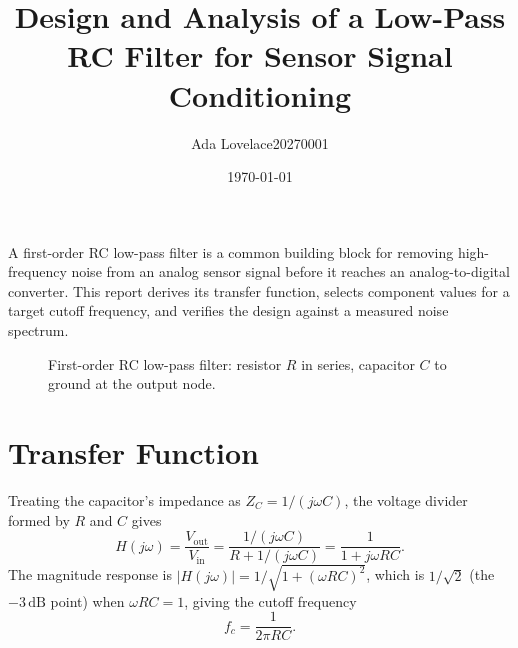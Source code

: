 \documentclass[a4paper,11pt,twocolumn]{article}
\title{\Large\textbf{Design and Analysis of a Low-Pass RC Filter for
  Sensor Signal Conditioning}}
\author{Ada Lovelace\hspace{1cm}20270001}
\date{\today}
\begin{document}
\maketitle

A first-order RC low-pass filter is a common building block for
removing high-frequency noise from an analog sensor signal before it
reaches an analog-to-digital converter. This report derives its
transfer function, selects component values for a target cutoff
frequency, and verifies the design against a measured noise spectrum.

\begin{center}
\begin{figure}[!h]
\centering
{}
\caption{First-order RC low-pass filter: resistor $R$ in series,
  capacitor $C$ to ground at the output node.}
\end{figure}
\end{center}

\section{Transfer Function}

Treating the capacitor's impedance as $Z_C = 1/(j\omega C)$, the
voltage divider formed by $R$ and $C$ gives
\begin{equation}
  H(j\omega) = \frac{V_{\text{out}}}{V_{\text{in}}}
  = \frac{1/(j\omega C)}{R + 1/(j\omega C)}
  = \frac{1}{1 + j\omega RC}.
  \label{eq:transfer}
\end{equation}
The magnitude response is $|H(j\omega)| = 1/\sqrt{1 + (\omega RC)^2}$,
which is $1/\sqrt{2}$ (the $-3\,\text{dB}$ point) when
$\omega RC = 1$, giving the cutoff frequency
\begin{equation}
  f_c = \frac{1}{2\pi RC}.
  \label{eq:cutoff}
\end{equation}
\end{document}
